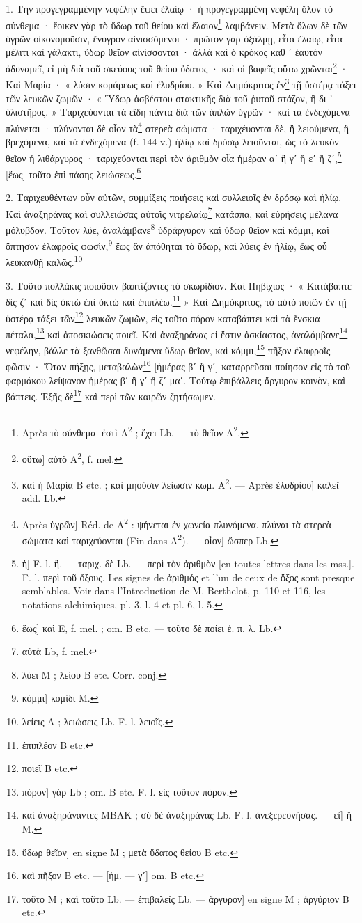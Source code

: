 \documentclass[a4paper, 11pt, oneside, polutonikogreek, french]{article}
\begin{document}
\bigskip

1. Τὴν προγεγραμμένην νεφέλην ἕψει ἐλαίῳ · ἡ προγεγραμμένη νεφέλη ὅλον τὸ σύνθεμα · ἔοικεν γὰρ τὸ ὕδωρ τοῦ θείου καὶ ἔλαιον\footnote{Après τὸ σύνθεμα] ἐστὶ A\textsuperscript{2} ; ἔχει Lb. --- τὸ θεῖον A\textsuperscript{2}.} λαμβάνειν. Μετὰ ὅλων δὲ τῶν ὑγρῶν οἰκονομοῦσιν, ἔνυγρον αἰνισσόμενοι · πρῶτον γὰρ ὀξάλμῃ, εἶτα ἐλαίῳ, εἶτα μέλιτι καὶ γάλακτι, ὕδωρ θεῖον αἰνίσσονται · ἀλλὰ καὶ ὁ κρόκος καθ ᾽ ἑαυτὸν ἀδυναμεῖ, εἰ μὴ διὰ τοῦ σκεύους τοῦ θείου ὕδατος · καὶ οἱ βαφεῖς οὕτω χρῶνται\footnote{οὕτω] αὐτὸ A\textsuperscript{2}, f. mel.} · Καὶ Μαρία · « λύσιν κομάρεως καὶ ἐλυδρίου. » Καὶ Δημόκριτος ἐν\footnote{καὶ ἡ Mαρία B etc. ; καὶ μηούσιν λείωσιν κωμ. A\textsuperscript{2}. --- Après ἐλυδρίου] καλεῖ add. Lb.} τῇ ὑστέρᾳ τάξει τῶν λευκῶν ζωμῶν · « Ὕδωρ ἀσβέστου στακτικῆς διὰ τοῦ ῥυτοῦ στάζον, ἢ δι ᾽ ὑλιστῆρος. » Ταριχεύονται τὰ εἴδη πάντα διὰ τῶν ἁπλῶν ὑγρῶν · καὶ τὰ ἐνδεχόμενα πλύνεται · πλύνονται δὲ οἷον τὰ\footnote{Après ὑγρῶν] Réd. de A\textsuperscript{2} : ψήνεται ἐν χωνεία πλυνόμενα. πλύναι τὰ στερεὰ σώματα καὶ ταριχεύονται (Fin dans A\textsuperscript{2}). --- οἷον] ὥσπερ Lb.} στερεὰ σώματα · ταριχέυονται δὲ, ἢ λειούμενα, ἢ βρεχόμενα, καὶ τὰ ἐνδεχόμενα (f. 144 v.) ἡλίῳ καὶ δρόσῳ λειοῦνται, ὡς τὸ λευκὸν θεῖον ἡ λιθάργυρος · ταριχεύονται περὶ τὸν ἀριθμὸν οἷα ἡμέραν αʹ ἢ γʹ ἢ εʹ ἢ ζʹ,\footnote{ἡ] F. l. ἢ. --- ταριχ. δὲ Lb. --- περὶ τὸν ἀριθμὸν [en toutes lettres dans les mss.]. F. l. περὶ τοῦ ὄξους. Les signes de ἀριθμός et l'un de ceux de ὄξος sont presque semblables. Voir dans l'Introduction de M. Berthelot, p. 110 et 116, les notations alchimiques, pl. 3, l. 4 et pl. 6, l. 5.} [ἕως] τοῦτο ἐπὶ πάσης λειώσεως.\footnote{ἕως] καὶ E, f. mel. ; om. B etc. --- τοῦτο δὲ ποίει ἐ. π. λ. Lb.}

2. Ταριχευθέντων οὖν αὐτῶν, συμμίξεις ποιήσεις καὶ συλλειοῖς ἐν δρόσῳ καὶ ἡλίῳ. Καὶ ἀναξηράνας καὶ συλλειώσας αὐτοῖς νιτρελαίῳ\footnote{αὐτὰ Lb, f. mel.} κατάσπα, καὶ εὑρήσεις μέλανα μόλυβδον. Τοῦτον λύε, ἀναλάμβανε\footnote{λύει M ; λείου B etc. Corr. conj.} ὑδράργυρον καὶ ὕδωρ θεῖον καὶ κόμμι, καὶ ὄπτησον ἐλαφροῖς φωσὶν,\footnote{κόμμι] κομίδι M.} ἕως ἄν ἀπόθηται τὸ ὕδωρ, καὶ λύεις ἐν ἡλίῳ, ἕως οὗ λευκανθῇ καλῶς.\footnote{λείεις A ; λειώσεις Lb. F. l. λειοῖς.}

3. Τοῦτο πολλάκις ποιοῦσιν βαπτίζοντες τὸ σκωρίδιον. Καὶ Πηβίχιος · « Κατάβαπτε δὶς ζʹ καὶ δὶς ὀκτὼ ἐπὶ ὀκτὼ καὶ ἐπιπλέω.\footnote{ἐπιπλέον B etc.} » Καὶ Δημόκριτος, τὸ αὐτὸ ποιῶν ἐν τῇ ὑστέρᾳ τάξει τῶν\footnote{ποιεῖ B etc.} λευκῶν ζωμῶν, εἰς τοῦτο πόρον καταβάπτει καὶ τὰ ἔνσκια πέταλα,\footnote{πόρον] γὰρ Lb ; om. B etc. F. l. εἰς τοῦτον πόρον.} καὶ ἀποσκιώσεις ποιεῖ. Καὶ ἀναξηράνας εἰ ἔστιν ἀσκίαστος, ἀναλάμβανε\footnote{καὶ ἀναξηράναντες MBAK ; σὺ δὲ ἀναξηράνας Lb. F. l. ἀνεξερευνήσας. --- εἰ] ἥ M.} νεφέλην, βάλλε τὰ ξανθῶσαι δυνάμενα ὕδωρ θεῖον, καὶ κόμμι,\footnote{ὕδωρ θεῖον] en signe M ; μετὰ ὕδατος θείου B etc.} πῆξον ἐλαφροῖς φῶσιν · Ὅταν πήξῃς, μεταβαλὼν\footnote{καὶ πῆξον B etc. --- [ἡμ. --- γʹ] om. B etc.} [ἡμέρας βʹ ἢ γʹ] καταρρεῦσαι ποίησον εἰς τὸ τοῦ φαρμάκου λείψανον ἡμέρας βʹ ἢ γʹ ἢ ζʹ μαʹ. Τούτῳ ἐπιβάλλεις ἄργυρον κοινὸν, καὶ βάπτεις. Ἑξῆς δὲ\footnote{τοῦτο M ; καὶ τοῦτο Lb. --- ἐπιβαλείς Lb. --- ἄργυρον] en signe M ; ἀργύριον B etc.} καὶ περὶ τῶν καιρῶν ζητήσωμεν.
\end{document}
